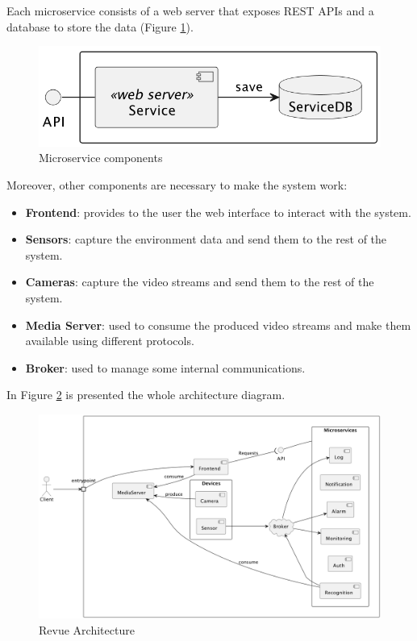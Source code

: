 \documentclass{scrartcl}
\begin{document}
    Each microservice consists of a web server that exposes REST APIs and a database to store the data (Figure \ref{fig:microservice}).

    \begin{figure}
        \centering
        \includegraphics[scale=0.6]{img/microservice}
        \caption{Microservice components}
        \label{fig:microservice}
    \end{figure}

    Moreover, other components are necessary to make the system work:

    \begin{itemize}
        \item \textbf{Frontend}: provides to the user the web interface to interact with the system.
        \item \textbf{Sensors}: capture the environment data and send them to the rest of the system.
        \item \textbf{Cameras}: capture the video streams and send them to the rest of the system.
        \item \textbf{Media Server}: used to consume the produced video streams and make them available using different protocols.
        \item \textbf{Broker}: used to manage some internal communications.
    \end{itemize}

    In Figure \ref{fig:architecture} is presented the whole architecture diagram.

    \begin{figure}
        \centering
        \includegraphics[scale=0.51]{img/architecture}
        \caption{Revue Architecture}
        \label{fig:architecture}
    \end{figure}
\end{document}
